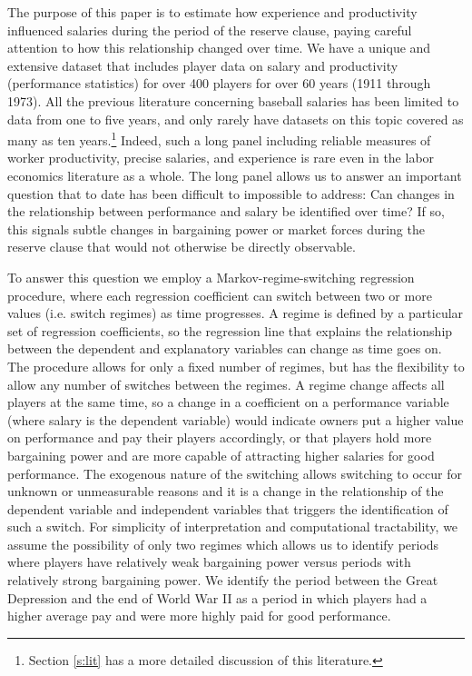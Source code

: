 \documentclass[12pt]{article}
\begin{document}
The purpose of this paper is to estimate how experience and productivity influenced salaries during the period of the reserve clause, paying careful attention to how this relationship changed over time.  We have a unique and extensive dataset that includes player data on salary and productivity (performance statistics) for over 400 players for over 60 years (1911 through 1973).  All the previous literature concerning baseball salaries has been limited to data from one to five years, and only rarely have datasets on this topic covered as many as ten years.\footnote{Section \ref{s:lit} has a more detailed discussion of this literature.}  Indeed, such a long panel including reliable measures of worker productivity, precise salaries, and experience is rare even in the labor economics literature as a whole.  The long panel allows us to answer an important question that to date has been difficult to impossible to address: Can changes in the relationship between performance and salary be identified over time?  If so, this signals subtle changes in bargaining power or market forces during the reserve clause that would not otherwise be directly observable.

To answer this question we employ a Markov-regime-switching regression procedure, where each regression coefficient can switch between two or more values (i.e. switch regimes) as time progresses.  A regime is defined by a particular set of regression coefficients, so the regression line that explains the relationship between the dependent and explanatory variables can change as time goes on.  The procedure allows for only a fixed number of regimes, but has the flexibility to allow any number of switches between the regimes.  A regime change affects all players at the same time, so a change in a coefficient on a performance variable (where salary is the dependent variable) would indicate owners put a higher value on performance and pay their players accordingly, or that players hold more bargaining power and are more capable of attracting higher salaries for good performance.  The exogenous nature of the switching allows switching to occur for unknown or unmeasurable reasons and it is a change in the relationship of the dependent variable and independent variables that triggers the identification of such a switch.  For simplicity of interpretation and computational tractability, we assume the possibility of only two regimes which allows us to identify periods where players have relatively weak bargaining power versus periods with relatively strong bargaining power.  We identify the period between the Great Depression and the end of World War II as a period in which players had a higher average pay and were more highly paid for good performance.
\end{document}
